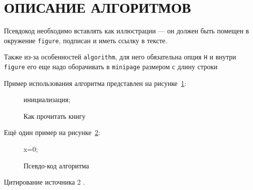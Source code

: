 \section{ОПИСАНИЕ АЛГОРИТМОВ}

Псевдокод необходимо вставлять как иллюстрации --- он должен быть помещен в окружение \texttt{figure}, подписан и иметь ссылку в тексте.

Также из-за особенностей \texttt{algorithm}, для него обязательна опция \texttt{H} и внутри \texttt{figure} его еще надо оборачивать в \texttt{minipage} размером с длину строки

Пример использования алгоритма представлен на рисунке~\ref{alg:alg1}:

\begin{figure}
\begin{minipage}{\linewidth}
\begin{algorithm}[H]  
    \SetAlgoVlined
    инициализация;
\end{algorithm}
\end{minipage}
\caption{Как прочитать книгу}
\label{alg:alg1}
\end{figure}

\lipsum[1][1]

\pagebreak

Ещё один пример на рисунке~\ref{alg:generalGP}:

\begin{figure}
\begin{minipage}{\linewidth}
\begin{algorithm}[H]
	\SetAlgoVlined %
	
	x=0;
	\While{ $\tau_{norm} > \varepsilon_{tol}$ }{
		$s_{k-1} \leftarrow x_k - x_{k-1}$;
		\tcc*[l]{Step lenght computation:} %
		\eIf{$k$ is even}{
			$ \alpha_k^{ABB} = \frac{ s_{k-1}^T y_{k-1}}{y_{k-1}^T y_{k-1}}$
		}{ %
		$\alpha_k^{ABB} = \frac{ s_{k-1}^T s_{k-1}}{s_{k-1}^T y_{k-1}}$
	} %
	$k \leftarrow k + 1$;
	\For{ i = 1}{
		$x_{i+1} = P_\Omega(x_i - \alpha_k^{ABB}*g_k)$;
	} %
	\tcc*[l]{Compute the termination constant} %
	$\tau_{norm} = abs ( ||x_{k}||_2 - ||x_{k-1}||_2)$
} %
\end{algorithm}
\end{minipage}
\caption{Псевдо-код алгоритма}
\label{alg:generalGP}
\end{figure}

Цитирование источника 2 \cite{cite_1_10}.
